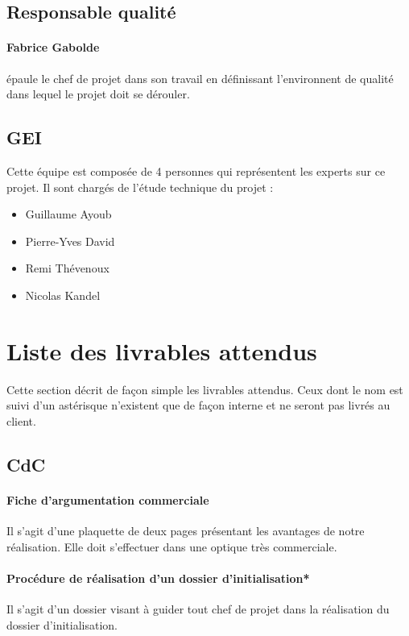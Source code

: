 \documentclass[a4paper, 11pt, draft]{report}
\begin{document}
    \subsection{Responsable qualité}
        \paragraph{Fabrice Gabolde} épaule le chef de projet dans son travail en définissant l'environnent de qualité dans lequel le projet doit se dérouler.
        
    \subsection{GEI}
        Cette équipe est composée de 4 personnes qui représentent les experts sur ce projet. Il sont chargés de l'étude technique du projet : 
        \begin{itemize}
            \item Guillaume Ayoub
            \item Pierre-Yves David
            \item Remi Thévenoux
            \item Nicolas Kandel
       \end{itemize}

\section{Liste des livrables attendus}

Cette section décrit de façon simple les livrables attendus. Ceux dont le nom est suivi d'un astérisque n'existent que de façon interne et ne seront pas livrés au client.
    \subsection{CdC}
        \paragraph{Fiche d'argumentation commerciale} Il s'agit d'une plaquette de deux pages présentant les avantages de notre réalisation. Elle doit s'effectuer dans une optique très commerciale.
        \paragraph{Procédure de réalisation d'un dossier d'initialisation*} Il s'agit d'un dossier visant à guider tout chef de projet dans la réalisation du dossier d'initialisation.
\end{document}
